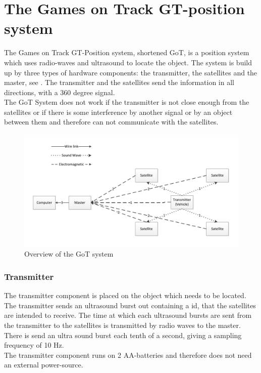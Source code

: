 \section{The Games on Track GT-position system}
\label{GoTDescription}
The Games on Track GT-Position system, shortened GoT, is a position system which uses radio-waves and ultrasound to locate the object. The system is build up by three types of hardware components: the transmitter, the satellites and the master, see . The transmitter and the satellites send the information in all directions, with a 360 degree signal.\\
The GoT System does not work if the transmitter is not close enough from the satellites or if there is some interference by another signal or by an object between them and therefore can not communicate with the satellites.

\begin{figure}[H]
	\centering
	\includegraphics[scale=0.6]{figures/GoT_description.pdf}
	\caption{Overview of the GoT system}
	\label{GoTSystem}
\end{figure}

\subsubsection{Transmitter}
The transmitter component is placed on the object which needs to be located. The transmitter sends an ultrasound burst out containing a id, that the satellites are intended to receive. The time at which each ultrasound bursts are sent from the transmitter to the satellites is transmitted by radio waves to the master. There is send an ultra sound burst each tenth of a second, giving a sampling frequency of 10 Hz.\\ 
The transmitter component runs on 2 AA-batteries and therefore does not need an external power-source.\\

